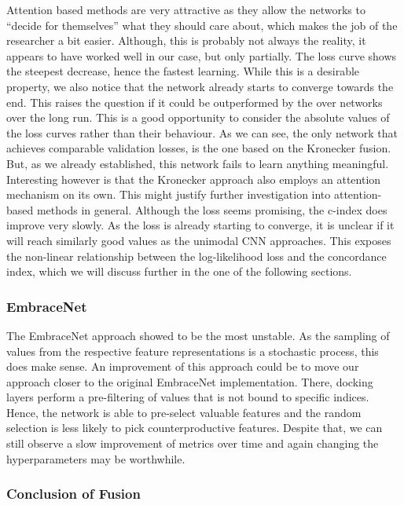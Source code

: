 Attention based methods are very attractive as they allow the networks to “decide for themselves” what they should care about, which makes the job of the researcher a bit easier. Although, this is probably not always the reality, it appears to have worked well in our case, but only partially. The loss curve shows the steepest decrease, hence the fastest learning. While this is a desirable property, we also notice that the network already starts to converge towards the end. This raises the question if it could be outperformed by the over networks over the long run. This is a good opportunity to consider the absolute values of the loss curves rather than their behaviour. As we can see, the only network that achieves comparable validation losses, is the one based on the Kronecker fusion. But, as we already established, this network fails to learn anything meaningful. 
Interesting however is that the Kronecker approach also employs an attention mechanism on its own. This might justify further investigation into attention-based methods in general.
Although the loss seems promising, the c-index does improve very slowly. As the loss is already starting to converge, it is unclear if it will reach similarly good values as the unimodal CNN approaches. This exposes the non-linear relationship between the log-likelihood loss and the concordance index, which we will discuss further in the one of the following sections.

\subsubsection{EmbraceNet}

The EmbraceNet approach showed to be the most unstable. As the sampling of values from the respective feature representations is a stochastic process, this does make sense. An improvement of this approach could be to move our approach closer to the original EmbraceNet implementation. There, docking layers perform a pre-filtering of values that is not bound to specific indices. \cite{Choi2019EmbraceNet} Hence, the network is able to pre-select valuable features and the random selection is less likely to pick counterproductive features. Despite that, we can still observe a slow improvement of metrics over time and again changing the hyperparameters may be worthwhile.

\subsubsection{Conclusion of Fusion}

